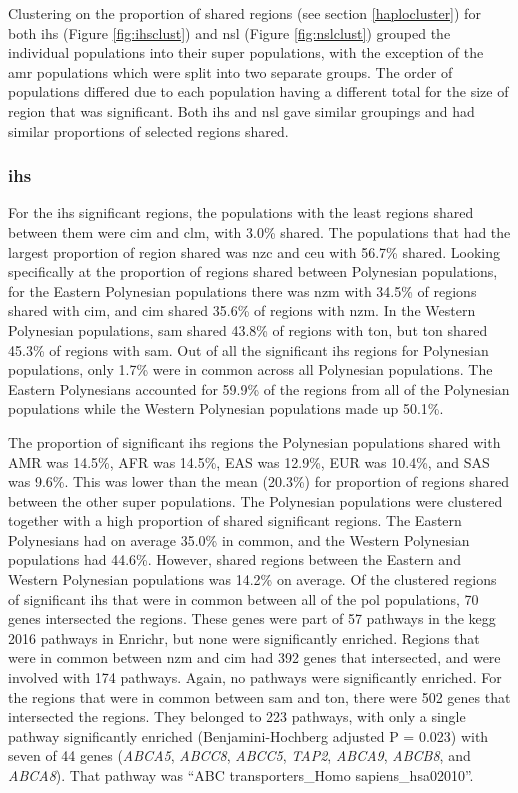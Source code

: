 \documentclass[]{report}
\begin{document}
Clustering on the proportion of shared regions (see section
\ref{haplocluster}) for both \gls{ihs} (Figure \ref{fig:ihsclust}) and
\gls{nsl} (Figure \ref{fig:nslclust}) grouped the individual populations
into their super populations, with the exception of the \gls{amr}
populations which were split into two separate groups. The order of
populations differed due to each population having a different total for
the size of region that was significant. Both \gls{ihs} and \gls{nsl}
gave similar groupings and had similar proportions of selected regions
shared.

\subsubsection{\texorpdfstring{\gls{ihs}}{}}\label{section}

For the \gls{ihs} significant regions, the populations with the least
regions shared between them were \gls{cim} and \gls{clm}, with 3.0\%
shared. The populations that had the largest proportion of region shared
was \gls{nzc} and \gls{ceu} with 56.7\% shared. Looking specifically at
the proportion of regions shared between Polynesian populations, for the
Eastern Polynesian populations there was \gls{nzm} with 34.5\% of
regions shared with \gls{cim}, and \gls{cim} shared 35.6\% of regions
with \gls{nzm}. In the Western Polynesian populations, \gls{sam} shared
43.8\% of regions with \gls{ton}, but \gls{ton} shared 45.3\% of regions
with \gls{sam}. Out of all the significant \gls{ihs} regions for
Polynesian populations, only 1.7\% were in common across all Polynesian
populations. The Eastern Polynesians accounted for 59.9\% of the regions
from all of the Polynesian populations while the Western Polynesian
populations made up 50.1\%.

The proportion of significant \gls{ihs} regions the Polynesian
populations shared with AMR was 14.5\%, AFR was 14.5\%, EAS was 12.9\%,
EUR was 10.4\%, and SAS was 9.6\%. This was lower than the mean (20.3\%)
for proportion of regions shared between the other super populations.
The Polynesian populations were clustered together with a high
proportion of shared significant regions. The Eastern Polynesians had on
average 35.0\% in common, and the Western Polynesian populations had
44.6\%. However, shared regions between the Eastern and Western
Polynesian populations was 14.2\% on average. Of the clustered regions
of significant \gls{ihs} that were in common between all of the
\gls{pol} populations, 70 genes intersected the regions. These genes
were part of 57 pathways in the \gls{kegg} 2016 pathways in Enrichr, but
none were significantly enriched. Regions that were in common between
\gls{nzm} and \gls{cim} had 392 genes that intersected, and were
involved with 174 pathways. Again, no pathways were significantly
enriched. For the regions that were in common between \gls{sam} and
\gls{ton}, there were 502 genes that intersected the regions. They
belonged to 223 pathways, with only a single pathway significantly
enriched (Benjamini-Hochberg adjusted P = 0.023) with seven of 44 genes
(\emph{ABCA5}, \emph{ABCC8}, \emph{ABCC5}, \emph{TAP2}, \emph{ABCA9},
\emph{ABCB8}, and \emph{ABCA8}). That pathway was ``ABC
transporters\_Homo sapiens\_hsa02010''.
\end{document}
